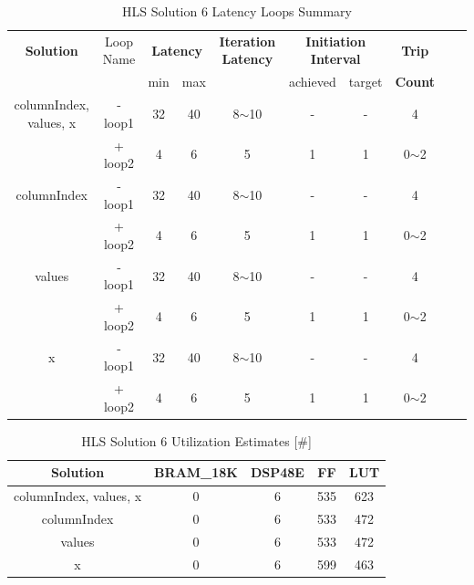 \begin{table}[H]
	\centering
	\begin{tabular}{|c|c|c|c|c|c|c|c|c|c|}
		\hline
		\multicolumn{1}{|c|}{\textbf{Solution}} & \multicolumn{1}{|c|}{Loop Name} & \multicolumn{2}{|c|}{\textbf{Latency}} & \multicolumn{1}{c|}{\textbf{Iteration Latency}} & \multicolumn{2}{c|}{\textbf{Initiation Interval}} & \multicolumn{1}{c|}{\textbf{Trip}}  \\
		&  & min & max & & achieved & target & \textbf{Count} \\
		\hline
		columnIndex, values, x & - loop1 & 32 & 40 & 8$\sim$10 & - & - & 4 \\
		& + loop2 & 4 & 6 & 5 & 1 & 1 & 0$\sim$2 \\
		\hline
		columnIndex & - loop1 & 32 & 40 & 8$\sim$10 & - & - & 4 \\
		& + loop2 & 4 & 6 & 5 & 1 & 1 & 0$\sim$2 \\
		\hline
		values & - loop1 & 32 & 40 & 8$\sim$10 & - & - & 4 \\
		& + loop2 & 4 & 6 & 5 & 1 & 1 & 0$\sim$2 \\
		\hline
		x & - loop1 & 32 & 40 & 8$\sim$10 & - & - & 4 \\
		& + loop2 & 4 & 6 & 5 & 1 & 1 & 0$\sim$2 \\
		\hline
	\end{tabular}
	\caption{HLS Solution 6 Latency Loops Summary }
	\label{tab:hls-solution-6-loop-summary}
\end{table}

\begin{table}[H]
	\centering
	\begin{tabular}{|c|c|c|c|c|}
		\hline
		\textbf{Solution} & \textbf{BRAM\_18K} & \textbf{DSP48E} & \textbf{FF} & \textbf{LUT} \\
		\hline
		columnIndex, values, x & 0 & 6 & 535 & 623 \\
		\hline
		columnIndex & 0 & 6 & 533 & 472 \\
		\hline
		values & 0 & 6 & 533 & 472 \\
		\hline
		x & 0 & 6 & 599 & 463 \\
		\hline
	\end{tabular}
	\caption{HLS Solution 6 Utilization Estimates [\#]}
	\label{tab:hls-solution-6-utilization-report}
\end{table}

